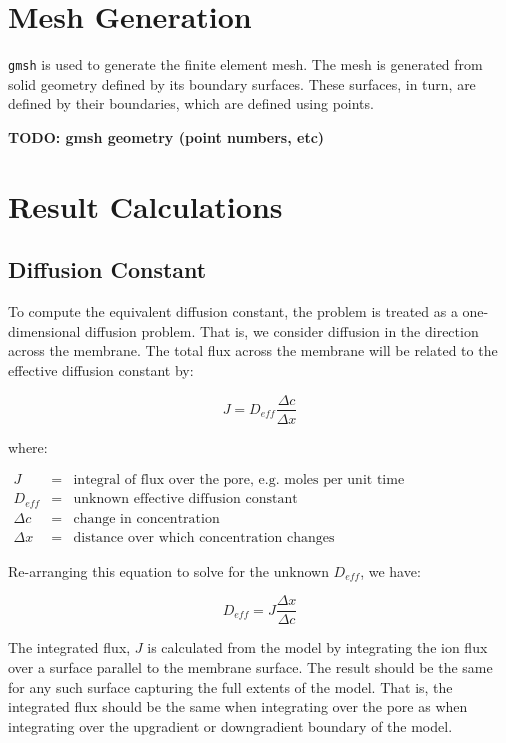 \documentclass{article}
\begin{document}
\section{Mesh Generation}\label{sec:meshgen}

\texttt{gmsh} is used to generate the finite element mesh.
The mesh is generated from solid geometry defined by its boundary surfaces.
These surfaces, in turn, are defined by their boundaries,
which are defined using points.

\textbf{TODO: gmsh geometry (point numbers, etc)}

\section{Result Calculations}

\subsection{Diffusion Constant}\label{subsec:D_eff}

To compute the equivalent diffusion constant, the problem is treated as a one-dimensional diffusion problem.
That is, we consider diffusion in the direction across the membrane.
The total flux across the membrane will be related to the effective diffusion constant by:

$$J = D_{eff} \frac{\Delta c}{\Delta x}$$

where:

$\begin{array}{rcl}
J & = & \text{integral of flux over the pore, e.g. moles per unit time} \\
D_{eff} & = & \text{unknown effective diffusion constant} \\
\Delta c & = & \text{change in concentration} \\
\Delta x & = & \text{distance over which concentration changes}
\end{array}$

Re-arranging this equation to solve for the unknown $D_{eff}$, we have:

$$D_{eff} = J \frac{\Delta x}{\Delta c}$$

The integrated flux, $J$ is calculated from the model by integrating
the ion flux over a surface parallel to the membrane surface.
The result should be the same for any such surface capturing the full extents of the model.
That is, the integrated flux should be the same when integrating over the pore as
when integrating over the upgradient or downgradient boundary of the model.
\end{document}
